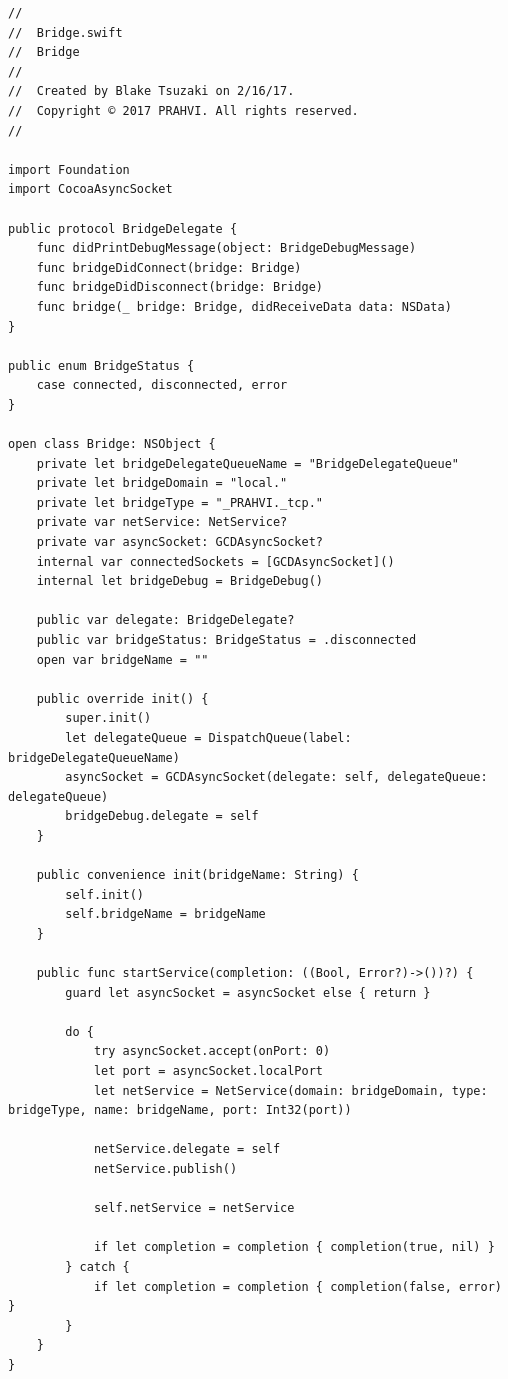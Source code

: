 \begin{lstlisting}
//
//  Bridge.swift
//  Bridge
//
//  Created by Blake Tsuzaki on 2/16/17.
//  Copyright © 2017 PRAHVI. All rights reserved.
//

import Foundation
import CocoaAsyncSocket

public protocol BridgeDelegate {
    func didPrintDebugMessage(object: BridgeDebugMessage)
    func bridgeDidConnect(bridge: Bridge)
    func bridgeDidDisconnect(bridge: Bridge)
    func bridge(_ bridge: Bridge, didReceiveData data: NSData)
}

public enum BridgeStatus {
    case connected, disconnected, error
}

open class Bridge: NSObject {
    private let bridgeDelegateQueueName = "BridgeDelegateQueue"
    private let bridgeDomain = "local."
    private let bridgeType = "_PRAHVI._tcp."
    private var netService: NetService?
    private var asyncSocket: GCDAsyncSocket?
    internal var connectedSockets = [GCDAsyncSocket]()
    internal let bridgeDebug = BridgeDebug()
    
    public var delegate: BridgeDelegate?
    public var bridgeStatus: BridgeStatus = .disconnected
    open var bridgeName = ""
    
    public override init() {
        super.init()
        let delegateQueue = DispatchQueue(label: bridgeDelegateQueueName)
        asyncSocket = GCDAsyncSocket(delegate: self, delegateQueue: delegateQueue)
        bridgeDebug.delegate = self
    }
    
    public convenience init(bridgeName: String) {
        self.init()
        self.bridgeName = bridgeName
    }
    
    public func startService(completion: ((Bool, Error?)->())?) {
        guard let asyncSocket = asyncSocket else { return }
        
        do {
            try asyncSocket.accept(onPort: 0)
            let port = asyncSocket.localPort
            let netService = NetService(domain: bridgeDomain, type: bridgeType, name: bridgeName, port: Int32(port))
            
            netService.delegate = self
            netService.publish()
            
            self.netService = netService
            
            if let completion = completion { completion(true, nil) }
        } catch {
            if let completion = completion { completion(false, error) }
        }
    }
}


\end{lstlisting}
